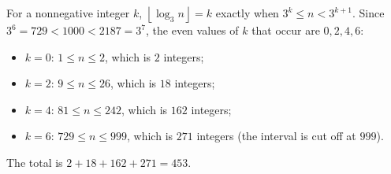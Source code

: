 For a nonnegative integer $k$, $\left\lfloor\log_3n\right\rfloor=k$ exactly when $3^k\le n<3^{k+1}$. Since $3^6=729<1000<2187=3^7$, the even values of $k$ that occur are $0,2,4,6$:
\begin{itemize}
\item $k=0$: $1\le n\le2$, which is $2$ integers;
\item $k=2$: $9\le n\le26$, which is $18$ integers;
\item $k=4$: $81\le n\le242$, which is $162$ integers;
\item $k=6$: $729\le n\le999$, which is $271$ integers (the interval is cut off at $999$).
\end{itemize}
The total is $2+18+162+271=\boxed{453}$.
